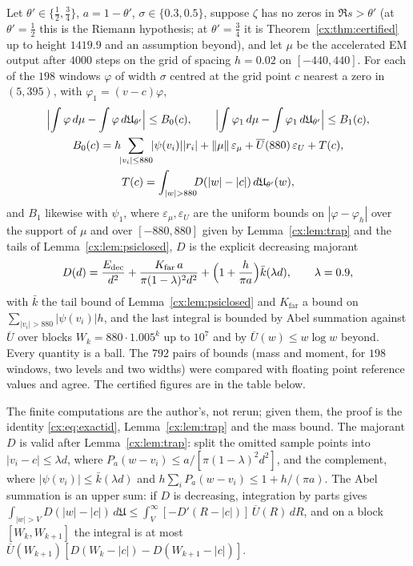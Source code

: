 \begin{theorem}\label{cx:thm:apostcert}
Let $\theta'\in\{\tfrac12,\tfrac34\}$, $a=1-\theta'$, $\sigma\in\{0.3,0.5\}$, suppose $\zeta$ has no zeros in $\Re s>\theta'$ (at $\theta'=\tfrac12$ this is the Riemann hypothesis; at $\theta'=\tfrac34$ it is Theorem~\ref{cx:thm:certified} up to height $1419.9$ and an assumption beyond), and let $\mu$ be the accelerated EM output after $4000$ steps on the grid of spacing $h=0.02$ on $[-440,440]$. For each of the $198$ windows $\varphi$ of width $\sigma$ centred at the grid point $c$ nearest a zero in $(5,395)$, with $\varphi_1=(v-c)\varphi$,
\begin{gather*}
\Bigl|\int\varphi\,d\mu-\int\varphi\,d\mathfrak U_{\theta'}\Bigr|\le B_0(c),\qquad\Bigl|\int\varphi_1\,d\mu-\int\varphi_1\,d\mathfrak U_{\theta'}\Bigr|\le B_1(c),\\
B_0(c)=h\!\!\sum_{|v_i|\le880}\!\!|\psi(v_i)||r_i|+\|\mu\|\,\varepsilon_\mu+\overline U(880)\,\varepsilon_U+T(c),\\ T(c)=\int_{|w|>880}\!\!\!D(|w|-|c|)\,d\mathfrak U_{\theta'}(w),
\end{gather*}
and $B_1$ likewise with $\psi_1$, where $\varepsilon_\mu,\varepsilon_U$ are the uniform bounds on $|\varphi-\varphi_h|$ over the support of $\mu$ and over $[-880,880]$ given by Lemma~\ref{cx:lem:trap} and the tails of Lemma~\ref{cx:lem:psiclosed}, $D$ is the explicit decreasing majorant
\[
D(d)=\frac{E_{\mathrm{dec}}}{d^2}+\frac{K_{\mathrm{far}}\,a}{\pi(1-\lambda)^2d^2}+\Bigl(1+\frac h{\pi a}\Bigr)\bar k(\lambda d),\qquad\lambda=0.9,
\]
with $\bar k$ the tail bound of Lemma~\ref{cx:lem:psiclosed} and $K_{\mathrm{far}}$ a bound on $\sum_{|v_i|>880}|\psi(v_i)|h$, and the last integral is bounded by Abel summation against $\overline U$ over blocks $W_k=880\cdot1.005^k$ up to $10^7$ and by $\overline U(w)\le w\log w$ beyond. Every quantity is a ball. The $792$ pairs of bounds (mass and moment, for $198$ windows, two levels and two widths) were compared with floating point reference values and agree. The certified figures are in the table below.
\end{theorem}

The finite computations are the author's, not rerun; given them, the proof is the identity \eqref{cx:eq:exactid}, Lemma~\ref{cx:lem:trap} and the mass bound. The majorant $D$ is valid after Lemma~\ref{cx:lem:trap}: split the omitted sample points into $|v_i-c|\le\lambda d$, where $P_a(w-v_i)\le a/[\pi(1-\lambda)^2d^2]$, and the complement, where $|\psi(v_i)|\le\bar k(\lambda d)$ and $h\sum_iP_a(w-v_i)\le1+h/(\pi a)$. The Abel summation is an upper sum: if $D$ is decreasing, integration by parts gives $\int_{|w|>V}D(|w|-|c|)\,d\mathfrak U\le\int_V^\infty[-D'(R-|c|)]\,\overline U(R)\,dR$, and on a block $[W_k,W_{k+1}]$ the integral is at most $\overline U(W_{k+1})[D(W_k-|c|)-D(W_{k+1}-|c|)]$.

